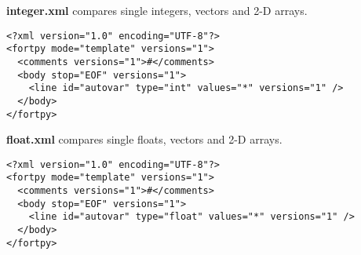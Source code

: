 \documentclass[paper=a4, fontsize=11pt]{scrartcl} %
\numberwithin{equation}{section} %
\numberwithin{figure}{section} %
\numberwithin{table}{section} %
\begin{document}
\textbf{integer.xml} compares single integers, vectors and 2-D arrays.

\begin{lstlisting}
<?xml version="1.0" encoding="UTF-8"?>
<fortpy mode="template" versions="1">
  <comments versions="1">#</comments>
  <body stop="EOF" versions="1">
    <line id="autovar" type="int" values="*" versions="1" />
  </body>
</fortpy>
\end{lstlisting}

\textbf{float.xml} compares single floats, vectors and 2-D arrays.

\begin{lstlisting}
<?xml version="1.0" encoding="UTF-8"?>
<fortpy mode="template" versions="1">
  <comments versions="1">#</comments>
  <body stop="EOF" versions="1">
    <line id="autovar" type="float" values="*" versions="1" />
  </body>
</fortpy>
\end{lstlisting}
\end{document}
